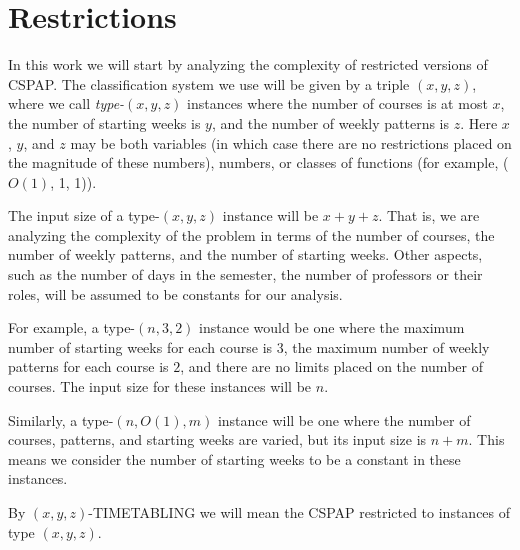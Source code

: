 \section{Restrictions}

In this work we will start by analyzing the complexity of restricted versions of CSPAP. The classification system we use will be given by a triple $(x, y, z)$, where we call \emph{type-}$(x, y, z)$ instances where the number of courses is at most $x$, the number of starting weeks is $y$, and the number of weekly patterns is $z$. Here $x$, $y$, and $z$ may be both variables (in which case there are no restrictions placed on the magnitude of these numbers), numbers, or classes of functions (for example, ($O(1)$, 1, 1)).

The input size of a type-$(x, y, z)$ instance will be $x + y + z$. That is, we are analyzing the complexity of the problem in terms of the number of courses, the number of weekly patterns, and the number of starting weeks. Other aspects, such as the number of days in the semester, the number of professors or their roles, will be assumed to be constants for our analysis.

For example, a type-$(n, 3, 2)$ instance would be one where the maximum number of starting weeks for each course is $3$, the maximum number of weekly patterns for each course is $2$, and there are no limits placed on the number of courses. The input size for these instances will be $n$.

Similarly, a type-$(n, O(1), m)$ instance will be one where the number of courses, patterns, and starting weeks are varied, but its input size is $n + m$. This means we consider the number of starting weeks to be a constant in these instances.

By $(x, y, z)$-TIMETABLING we will mean the CSPAP restricted to instances of type $(x, y, z)$.
